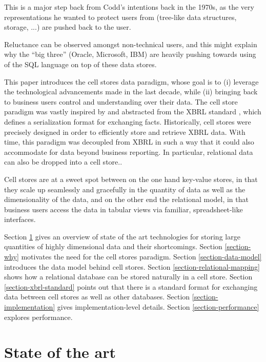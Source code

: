 \documentclass{vldb}
\begin{document}
This is a major step back from Codd's intentions back in the 1970s, as the very representations he wanted to protect users from (tree-like data structures, storage, ...) are pushed back to the user.

Reluctance can be observed amongst non-technical users, and this might explain why the ``big three'' (Oracle, Microsoft, IBM) are heavily pushing towards using of the SQL language \cite{Chamberlin1974} on top of these data stores.

This paper introduces the cell stores data paradigm, whose goal is to (i) leverage the technological advancements made in the last decade, while (ii) bringing back to business users control and understanding over their data. The cell store paradigm was vastly inspired by and abstracted from the XBRL standard \cite{XBRL}, which defines a serialization format for exchanging facts. Historically, cell stores were precisely designed in order to efficiently store and retrieve XBRL data. With time, this paradigm was decoupled from XBRL in such a way that it could also accommodate for data beyond business reporting. In particular, relational data can also be dropped into a cell store..

Cell stores are at a sweet spot between on the one hand key-value stores, in that they scale up seamlessly and gracefully in the quantity of data as well as the dimensionality of the data, and on the other end the relational model, in that business users access the data in tabular views via familiar, spreadsheet-like interfaces.

Section \ref{section-state-of-the-art} gives an overview of state of the art technologies for storing large quantities of highly dimensional data and their shortcomings. Section \ref{section-why} motivates the need for the cell stores paradigm. Section \ref{section-data-model} introduces the data model behind cell stores. Section \ref{section-relational-mapping} shows how a relational database can be stored naturally in a cell store. Section \ref{section-xbrl-standard} points out that there is a standard format for exchanging data between cell stores as well as other databases. Section \ref{section-implementation} gives implementation-level details. Section \ref{section-performance} explores performance.

\section{State of the art}
\label{section-state-of-the-art}
\end{document}
